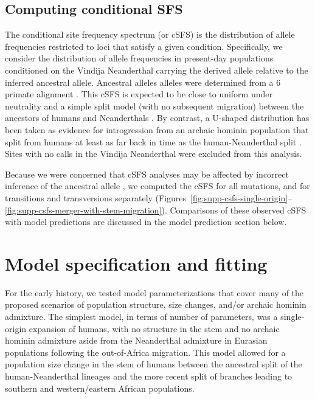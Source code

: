 \documentclass[]{article}
\begin{document}
\subsection{Computing conditional SFS}\label{sec:computing-csfs}

The conditional site frequency spectrum (or cSFS) is the distribution of allele
frequencies restricted to loci that satisfy a given condition. Specifically, we
consider the distribution of allele frequencies in present-day populations
conditioned on the Vindija Neanderthal carrying the derived allele relative to
the inferred ancestral allele. Ancestral alleles alleles were determined from a
6 primate alignment \citep{1000_Genomes_Project_Consortium2015-zq}.
This cSFS is expected to be close to
uniform under neutrality and a simple split model (with no subsequent
migration) between the ancestors of humans and Neanderthals
\citep{Chen2007-iy}. By contrast, a U-shaped distribution has been taken as
evidence for introgression from an archaic hominin population that split
from humans at least as far back in time as the human-Neanderthal split
\citep{Yang2012-ze,Durvasula2020-td}.
Sites with no calls in the Vindija Neanderthal were excluded from
this analysis.

Because we were concerned that cSFS analyses may be affected by incorrect
inference of the ancestral allele \citep{Hernandez2007-mf}, we computed the cSFS
for all mutations, and for transitions and transversions separately
(Figures~\ref{fig:supp-csfs-single-origin}--\ref{fig:supp-csfs-merger-with-stem-migration}).
Comparisons of these observed cSFS with model
predictions are discussed in the model prediction section below. 

\section{Model specification and fitting}
\label{modelspec}
For the early history, we tested model parameterizations that cover many of the
proposed scenarios of population structure, size changes, and/or archaic
hominin admixture. The simplest model, in terms of number of parameters, was a
single-origin expansion of humans, with no structure in the stem and no
archaic hominin admixture aside from the Neanderthal admixture in Eurasian populations
following the out-of-Africa migration. This model allowed for a population size
change in the stem of humans between the ancestral split of the
human-Neanderthal lineages and the more recent split of branches leading to
southern and western/eastern African populations.
\end{document}
